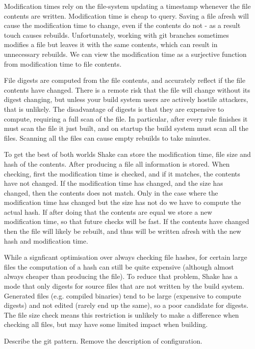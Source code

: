 Modification times rely on the file-system updating a timestamp whenever the file contents are written. Modification time is cheap to query. Saving a file afresh will cause the modification time to change, even if the contents do not - as a result touch causes rebuilds. Unfortunately, working with git branches sometimes modifies a file but leaves it with the same contents, which can result in unnecessary rebuilds. We can view the modification time as a surjective function from modification time to file contents.

File digests are computed from the file contents, and accurately reflect if the file contents have changed. There is a remote risk that the file will change without its digest changing, but unless your build system users are actively hostile attackers, that is unlikely. The disadvantage of digests is that they are expensive to compute, requiring a full scan of the file. In particular, after every rule finishes it must scan the file it just built, and on startup the build system must scan all the files. Scanning all the files can cause empty rebuilds to take minutes.

To get the best of both worlds Shake can store the modification time, file size and hash of the contents. After producing a file all information is stored. When checking, first the modification time is checked, and if it matches, the contents have not changed. If the modification time has changed, and the size has changed, then the contents does not match. Only in the case where the modification time has changed but the size has not do we have to compute the actual hash. If after doing that the contents are equal we store a new modification time, so that future checks will be fast. If the contents have changed then the file will likely be rebuilt, and thus will be written afresh with the new hash and modification time.

While a signficant optimisation over always checking file hashes, for certain large files the computation of a hash can still be quite expensive (although almost always cheaper than producing the file). To reduce that problem, Shake has a mode that only digests for source files that are not written by the build system. Generated files (e.g. compiled binaries) tend to be large (expensive to compute digests) and not edited (rarely end up the same), so a poor candidate for digests. The file size check means this restriction is unlikely to make a difference when checking all files, but may have some limited impact when building.

Describe the git pattern. Remove the description of configuration.
